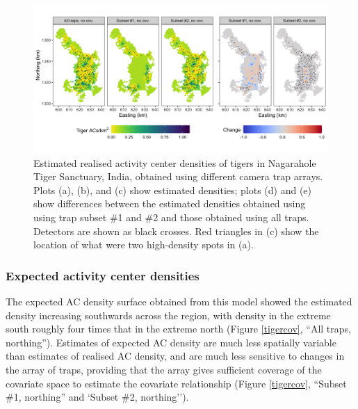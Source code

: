 \documentclass[10pt,a4paper]{article}
\begin{document}
\begin{figure}[htbp]
\centering
\includegraphics[width=1\textwidth]{tiger_surfaces_nocovs.png}
\caption{Estimated realised activity center densities of tigers in Nagarahole Tiger Sanctuary, India, obtained using different camera trap arrays. Plots (a), (b), and (c) show estimated densities; plots (d) and (e) show differences between the estimated densities obtained using using trap subset \#1 and \#2 and those obtained using all traps. Detectors are shown as black crosses. Red triangles in (c) show the location of what were two high-density spots in (a).}
\label{tigernocov}
\end{figure}

\subsubsection{Expected activity center densities}

The expected AC density surface obtained from this model showed the estimated density increasing southwards across the region, with density in the extreme south roughly four times that in the extreme north (Figure \ref{tigercov}, ``All traps, northing''). Estimates of expected AC density are much less spatially variable than estimates of realised AC density, and are much less sensitive to changes in the array of traps, providing that the array gives sufficient coverage of the covariate space to estimate the covariate relationship (Figure \ref{tigercov}, ``Subset \#1, northing'' and `Subset \#2, northing''). 
\end{document}
